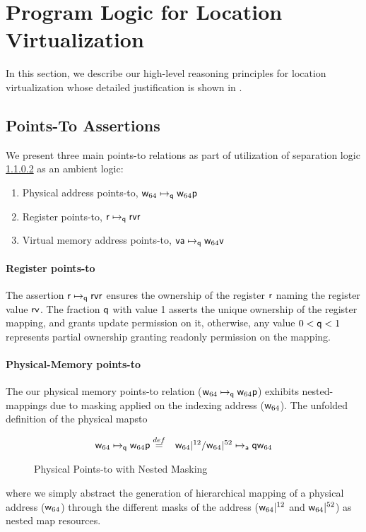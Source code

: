 \section{Program Logic for Location Virtualization}
\label{sec:logic}
In this section, we describe our high-level reasoning principles for location virtualization whose detailed justification is shown in . 
\subsection{Points-To Assertions}
\label{sec:pointsto}

We present three main points-to relations as part of utilization of separation logic \ref{} as an ambient logic:
\begin{enumerate}
\item Physical address points-to, $\mathsf{w}_{64}\mapsto_{\mathsf{q}}{\mathsf{w}_{64}}\mathsf{p}$
\item Register points-to, $\mathsf{r}\mapsto_{\mathsf{q}}{\mathsf{rv}}\mathsf{r}$
\item Virtual memory address points-to, $\mathsf{va}\mapsto_{\mathsf{q}}{\mathsf{w}_{64}}\mathsf{v}$
\end{enumerate}
\paragraph{Register points-to} The assertion $\mathsf{r}\mapsto_{\mathsf{q}}{\mathsf{rv}}\mathsf{r}$ ensures the ownership of the register $\mathsf{r}$ naming the register value $\mathsf{rv}$. The fraction $\mathsf{q}$ with value 1 asserts the unique ownership of the register mapping, and grants update permission on it, otherwise, any value $0 < \mathsf{q} <1$ represents partial ownership granting readonly permission on the mapping.
\paragraph{Physical-Memory points-to} The our physical memory points-to relation ($\mathsf{w}_{64}\mapsto_{\mathsf{q}}{\mathsf{w}_{64}}\mathsf{p}$) exhibits nested-mappings due to masking applied on the indexing address ($\mathsf{w}_{64}$). The unfolded definition of the physical mapsto 
\begin{figure}[!ht]
\[
\begin{array}{cl}
\mathsf{w}_{64}\mapsto_{\mathsf{q}}{\mathsf{w}_{64}}\mathsf{p} \stackrel{def}{=} & \mathsf{w}_{64}|^{12} / \mathsf{w}_{64}|^{52} \mapsto_{\mathsf{a}}{\mathsf{q}}\mathsf{w}_{64}
\end{array}
\]
\caption{Physical Points-to with Nested Masking}
  \label{fig:physicalpointsto}
\end{figure}
where we simply abstract the generation of hierarchical mapping of a physical address ($\mathsf{w}_{64}$) through the different masks of the address ($\mathsf{w}_{64}|^{12}$ and $\mathsf{w}_{64}|^{52}$) as nested map resources.
